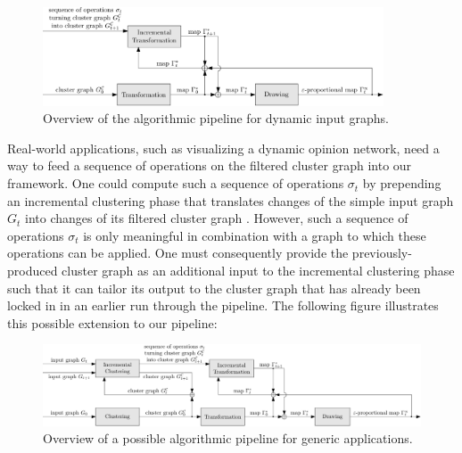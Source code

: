 \begin{figure}[H]
	\centering\includegraphics[width=0.9\textwidth]{Resources/Framework-3.pdf}
	\caption{Overview of the algorithmic pipeline for dynamic input graphs.}
	\label{fig:dynamic-pipeline-thesis}
\end{figure}

Real-world applications, such as visualizing a dynamic opinion network, need a way to feed a sequence of operations on the filtered cluster graph into our framework.
One could compute such a sequence of operations $\sigma_t$ by prepending an incremental clustering phase that translates changes of the simple input graph $G_t$ into changes of its filtered cluster graph .
However, such a sequence of operations $\sigma_t$ is only meaningful in combination with a graph to which these operations can be applied.
One must consequently provide the previously-produced cluster graph  as an additional input to the incremental clustering phase such that it can tailor its output to the cluster graph that has already been locked in in an earlier run through the pipeline.
The following figure illustrates this possible extension to our pipeline:
%
\begin{figure}[H]
	\centering\includegraphics[width=\textwidth]{Resources/Framework-4.pdf}
	\caption{Overview of a possible algorithmic pipeline for generic applications.}
	\label{fig:dynamic-pipeline-application}
\end{figure}

